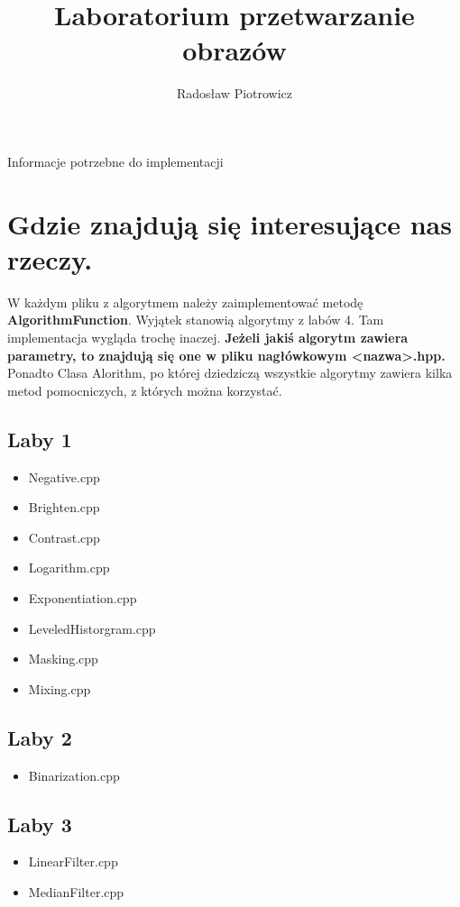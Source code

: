 \documentclass{article}
\title{Laboratorium przetwarzanie obrazów}
\date{}
\author{Radosław Piotrowicz}
\begin{document}
\maketitle

\begin{center}
    \large{ Informacje potrzebne do implementacji }
\end{center}

\newpage
\tableofcontents
\newpage

\section{Gdzie znajdują się interesujące nas rzeczy.}
W każdym pliku z algorytmem należy zaimplementować metodę \textbf{AlgorithmFunction}. Wyjątek stanowią algorytmy z labów 4. Tam implementacja wygląda trochę inaczej.
\newline
\textbf{Jeżeli jakiś algorytm zawiera parametry, to znajdują się one w pliku nagłówkowym <nazwa>.hpp.}
\newline
Ponadto Clasa Alorithm, po której dziedziczą wszystkie algorytmy zawiera kilka metod pomocniczych, z których można korzystać.

\subsection{Laby 1}
\begin{itemize}
    \item Negative.cpp
    \item Brighten.cpp
    \item Contrast.cpp
    \item Logarithm.cpp
    \item Exponentiation.cpp
    \item LeveledHistorgram.cpp
    \item Masking.cpp
    \item Mixing.cpp
\end{itemize}

\subsection{Laby 2}
\begin{itemize}
    \item Binarization.cpp
\end{itemize}

\subsection{Laby 3}
\begin{itemize}
    \item LinearFilter.cpp
    \item MedianFilter.cpp
\end{itemize}
\end{document}
